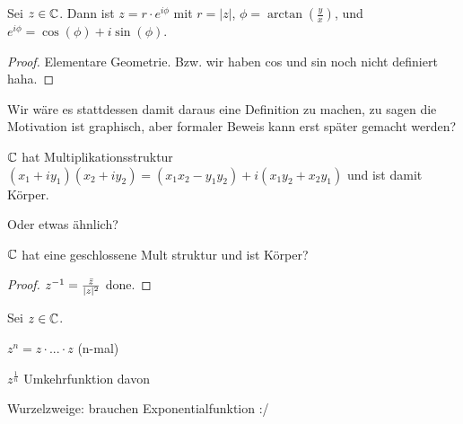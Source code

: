 \begin{lemma}[Polardarstellung]
    Sei $z \in \mathbb{C}$. Dann ist $z = r \cdot e^{i \phi}$ mit $r = |z|$, $\phi = \arctan(\frac{y}{x})$, und $e^{i \phi} = \cos(\phi) + i \sin(\phi)$.
\end{lemma}
\begin{proof}
    Elementare Geometrie. Bzw. wir haben cos und sin noch nicht definiert haha.
\end{proof}

\begin{query}
    Wir wäre es stattdessen damit daraus eine Definition zu machen, zu sagen die Motivation ist graphisch, aber formaler Beweis kann erst später gemacht werden?
\end{query}

\begin{lemma}[lemma]
    $\mathbb{C}$ hat Multiplikationsstruktur $(x_1 + iy_1)(x_2 + iy_2) = (x_1 x_2 - y_1 y_2) + i(x_1 y_2 + x_2 y_1)$ und ist damit Körper.

    Oder etwas ähnlich?

    $\mathbb{C}$ hat eine geschlossene Mult struktur und ist Körper?
\end{lemma}
\begin{proof}
    $z^{-1} = \frac{\bar{z}}{|z|^2}$ done.
\end{proof}

\begin{definition}
    Sei $z \in \mathbb{C}$.

    $z^n = z \cdot ... \cdot z$ (n-mal)

    $z^{\frac{1}{n}}$ Umkehrfunktion davon

    Wurzelzweige: brauchen Exponentialfunktion :/
\end{definition}
